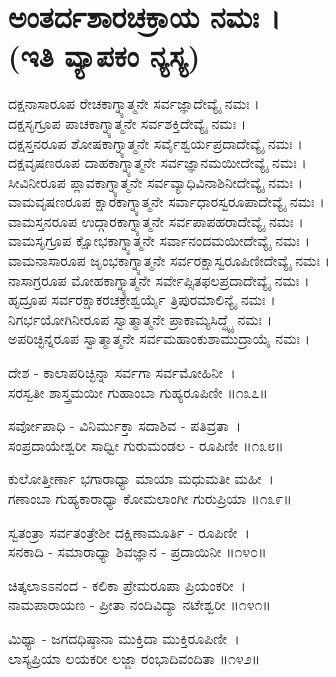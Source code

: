 \section{ಅಂತರ್ದಶಾರಚಕ್ರಾಯ ನಮಃ ।\\ (ಇತಿ ವ್ಯಾಪಕಂ ನ್ಯಸ್ಯ)}
ದಕ್ಷನಾಸಾರೂಪ ರೇಚಕಾಗ್ನ್ಯಾತ್ಮನೇ ಸರ್ವಜ್ಞಾದೇವ್ಯೈ ನಮಃ ।\\
ದಕ್ಷಸೃಗ್ರೂಪ ಪಾಚಕಾಗ್ನ್ಯಾತ್ಮನೇ ಸರ್ವಶಕ್ತಿದೇವ್ಯೈ ನಮಃ ।\\
ದಕ್ಷಸ್ತನರೂಪ ಶೋಷಕಾಗ್ನ್ಯಾತ್ಮನೇ ಸರ್ವೈಶ್ವರ್ಯಪ್ರದಾದೇವ್ಯೈ ನಮಃ ।\\
ದಕ್ಷವೃಷಣರೂಪ ದಾಹಕಾಗ್ನ್ಯಾತ್ಮನೇ ಸರ್ವಜ್ಞಾನಮಯೀದೇವ್ಯೈ ನಮಃ ।\\
ಸೀವಿನೀರೂಪ ಪ್ಲಾವಕಾಗ್ನ್ಯಾತ್ಮನೇ ಸರ್ವವ್ಯಾಧಿವಿನಾಶಿನೀದೇವ್ಯೈ ನಮಃ ।\\
ವಾಮವೃಷಣರೂಪ ಕ್ಷಾರಕಾಗ್ನ್ಯಾತ್ಮನೇ ಸರ್ವಾಧಾರಸ್ವರೂಪಾದೇವ್ಯೈ ನಮಃ ।\\
ವಾಮಸ್ತನರೂಪ ಉದ್ಗಾರಕಾಗ್ನ್ಯಾತ್ಮನೇ ಸರ್ವಪಾಪಹರಾದೇವ್ಯೈ ನಮಃ ।\\
ವಾಮಸೃಗ್ರೂಪ ಕ್ಷೋಭಕಾಗ್ನ್ಯಾತ್ಮನೇ ಸರ್ವಾನಂದಮಯೀದೇವ್ಯೈ ನಮಃ ।\\
ವಾಮನಾಸಾರೂಪ ಜೃಂಭಕಾಗ್ನ್ಯಾತ್ಮನೇ ಸರ್ವರಕ್ಷಾಸ್ವರೂಪಿಣೀದೇವ್ಯೈ ನಮಃ ।\\
ನಾಸಾಗ್ರರೂಪ ಮೋಹಕಾಗ್ನ್ಯಾತ್ಮನೇ ಸರ್ವೇಪ್ಸಿತಫಲಪ್ರದಾದೇವ್ಯೈ ನಮಃ ।\\
ಹೃದ್ರೂಪ ಸರ್ವರಕ್ಷಾಕರಚಕ್ರೇಶ್ವರ್ಯೈ ತ್ರಿಪುರಮಾಲಿನ್ಯೈ ನಮಃ ।\\
ನಿಗರ್ಭಯೋಗಿನೀರೂಪ ಸ್ವಾತ್ಮಾತ್ಮನೇ ಪ್ರಾಕಾಮ್ಯಸಿದ್ಧ್ಯೈ ನಮಃ ।\\
ಅಪರಿಚ್ಛಿನ್ನರೂಪ ಸ್ವಾತ್ಮಾತ್ಮನೇ ಸರ್ವಮಹಾಂಕುಶಾಮುದ್ರಾಯೈ ನಮಃ ।

ದೇಶ - ಕಾಲಾಪರಿಚ್ಛಿನ್ನಾ ಸರ್ವಗಾ ಸರ್ವಮೋಹಿನೀ~।\\
ಸರಸ್ವತೀ ಶಾಸ್ತ್ರಮಯೀ ಗುಹಾಂಬಾ ಗುಹ್ಯರೂಪಿಣೀ ॥೧೩೭॥

ಸರ್ವೋಪಾಧಿ - ವಿನಿರ್ಮುಕ್ತಾ ಸದಾಶಿವ - ಪತಿವ್ರತಾ~।\\
ಸಂಪ್ರದಾಯೇಶ್ವರೀ ಸಾಧ್ವೀ ಗುರುಮಂಡಲ - ರೂಪಿಣೀ ॥೧೩೮॥

ಕುಲೋತ್ತೀರ್ಣಾ ಭಗಾರಾಧ್ಯಾ ಮಾಯಾ ಮಧುಮತೀ ಮಹೀ~।\\
ಗಣಾಂಬಾ ಗುಹ್ಯಕಾರಾಧ್ಯಾ ಕೋಮಲಾಂಗೀ ಗುರುಪ್ರಿಯಾ ॥೧೩೯॥

ಸ್ವತಂತ್ರಾ ಸರ್ವತಂತ್ರೇಶೀ ದಕ್ಷಿಣಾಮೂರ್ತಿ - ರೂಪಿಣೀ~।\\
ಸನಕಾದಿ - ಸಮಾರಾಧ್ಯಾ ಶಿವಜ್ಞಾನ - ಪ್ರದಾಯಿನೀ ॥೧೪೦॥

ಚಿತ್ಕಲಾಽಽನಂದ - ಕಲಿಕಾ ಪ್ರೇಮರೂಪಾ ಪ್ರಿಯಂಕರೀ~।\\
ನಾಮಪಾರಾಯಣ - ಪ್ರೀತಾ ನಂದಿವಿದ್ಯಾ ನಟೇಶ್ವರೀ ॥೧೪೧॥

ಮಿಥ್ಯಾ - ಜಗದಧಿಷ್ಠಾನಾ ಮುಕ್ತಿದಾ ಮುಕ್ತಿರೂಪಿಣೀ~।\\
ಲಾಸ್ಯಪ್ರಿಯಾ ಲಯಕರೀ ಲಜ್ಜಾ ರಂಭಾದಿವಂದಿತಾ ॥೧೪೨॥

